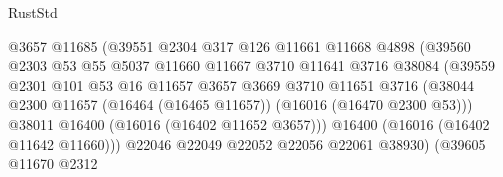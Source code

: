 \begin{lexlean}{RustStd}
\begin{coremodule}
                                        @3657
                                        @11685
                                        (@39551
                                          @2304
                                          @317
                                          @126
                                          @11661
                                          @11668
                                          @4898
                                          (@39560
                                            @2303
                                            @53
                                            @55
                                            @5037
                                            @11660
                                            @11667
                                            @3710
                                            @11641
                                            @3716
                                            @38084
                                            (@39559
                                              @2301
                                              @101
                                              @53
                                              @16
                                              @11657
                                              @3657
                                              @3669
                                              @3710
                                              @11651
                                              @3716
                                              (@38044
                                                @2300
                                                @11657
                                                (@16464 (@16465 @11657))
                                                (@16016 (@16470 @2300 @53)))
                                              @38011
                                              @16400
                                              (@16016 (@16402 @11652 @3657)))
                                            @16400
                                            (@16016 (@16402 @11642 @11660)))
                                          @22046
                                          @22049
                                          @22052
                                          @22056
                                          @22061
                                          @38930)
                                        (@39605
                                          @11670
                                          @2312

\end{coremodule}
\end{lexlean}
